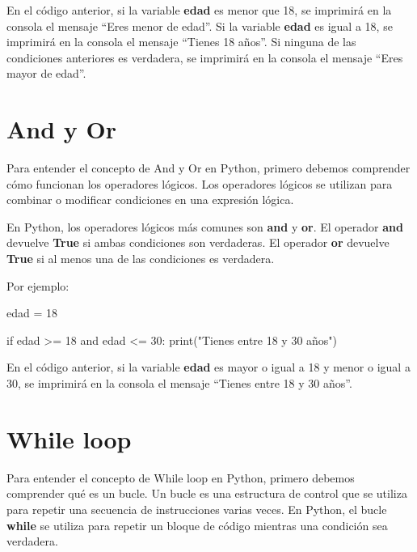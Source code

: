 \documentclass[
  a4paper,
  DIV=11,
  numbers=noendperiod,
  onepage,
  openany]{scrreprt}
\newenvironment{Shaded}{\begin{snugshade}}{\end{snugshade}}
\newcommand{\BuiltInTok}[1]{\textcolor[rgb]{0.00,0.23,0.31}{#1}}
\newcommand{\ControlFlowTok}[1]{\textcolor[rgb]{0.00,0.23,0.31}{#1}}
\newcommand{\DecValTok}[1]{\textcolor[rgb]{0.68,0.00,0.00}{#1}}
\newcommand{\KeywordTok}[1]{\textcolor[rgb]{0.00,0.23,0.31}{#1}}
\newcommand{\NormalTok}[1]{\textcolor[rgb]{0.00,0.23,0.31}{#1}}
\newcommand{\OperatorTok}[1]{\textcolor[rgb]{0.37,0.37,0.37}{#1}}
\newcommand{\StringTok}[1]{\textcolor[rgb]{0.13,0.47,0.30}{#1}}
\begin{document}
En el código anterior, si la variable \textbf{edad} es menor que 18, se
imprimirá en la consola el mensaje ``Eres menor de edad''. Si la
variable \textbf{edad} es igual a 18, se imprimirá en la consola el
mensaje ``Tienes 18 años''. Si ninguna de las condiciones anteriores es
verdadera, se imprimirá en la consola el mensaje ``Eres mayor de edad''.

\section{And y Or}\label{and-y-or}

Para entender el concepto de And y Or en Python, primero debemos
comprender cómo funcionan los operadores lógicos. Los operadores lógicos
se utilizan para combinar o modificar condiciones en una expresión
lógica.

En Python, los operadores lógicos más comunes son \textbf{and} y
\textbf{or}. El operador \textbf{and} devuelve \textbf{True} si ambas
condiciones son verdaderas. El operador \textbf{or} devuelve
\textbf{True} si al menos una de las condiciones es verdadera.

Por ejemplo:

\begin{Shaded}
\begin{Highlighting}[]
\NormalTok{edad }\OperatorTok{=} \DecValTok{18}

\ControlFlowTok{if}\NormalTok{ edad }\OperatorTok{\textgreater{}=} \DecValTok{18} \KeywordTok{and}\NormalTok{ edad }\OperatorTok{\textless{}=} \DecValTok{30}\NormalTok{:}
    \BuiltInTok{print}\NormalTok{(}\StringTok{"Tienes entre 18 y 30 años"}\NormalTok{)}
\end{Highlighting}
\end{Shaded}

En el código anterior, si la variable \textbf{edad} es mayor o igual a
18 y menor o igual a 30, se imprimirá en la consola el mensaje ``Tienes
entre 18 y 30 años''.

\section{While loop}\label{while-loop}

Para entender el concepto de While loop en Python, primero debemos
comprender qué es un bucle. Un bucle es una estructura de control que se
utiliza para repetir una secuencia de instrucciones varias veces. En
Python, el bucle \textbf{while} se utiliza para repetir un bloque de
código mientras una condición sea verdadera.
\end{document}
